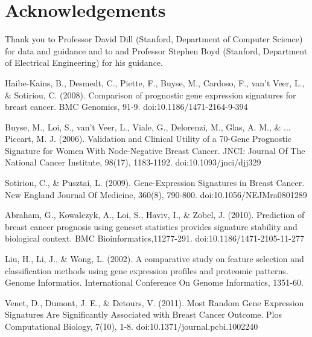 \documentclass[11pt]{article}
\begin{document}
\section{Acknowledgements}
Thank you to Professor David Dill (Stanford, Department of Computer Science) for data and guidance and to and Professor Stephen Boyd (Stanford, Department of Electrical Engineering) for his guidance.

\begin{thebibliography}{9}
 Haibe-Kains, B., Desmedt, C., Piette, F., Buyse, M., Cardoso, F., van't Veer, L., \& Sotiriou, C. (2008). Comparison of prognostic gene expression signatures for breast cancer. BMC Genomics, 91-9. doi:10.1186/1471-2164-9-394

 Buyse, M., Loi, S., van't Veer, L., Viale, G., Delorenzi, M., Glas, A. M., \& ... Piccart, M. J. (2006). Validation and Clinical Utility of a 70-Gene Prognostic Signature for Women With Node-Negative Breast Cancer. JNCI: Journal Of The National Cancer Institute, 98(17), 1183-1192. doi:10.1093/jnci/djj329

 Sotiriou, C., \& Pusztai, L. (2009). Gene-Expression Signatures in Breast Cancer. New England Journal Of Medicine, 360(8), 790-800. doi:10.1056/NEJMra0801289

 Abraham, G., Kowalczyk, A., Loi, S., Haviv, I., \& Zobel, J. (2010). Prediction of breast cancer prognosis using geneset statistics provides signature stability and biological context. BMC Bioinformatics,11277-291. doi:10.1186/1471-2105-11-277

 Liu, H., Li, J., \& Wong, L. (2002). A comparative study on feature selection and classification methods using gene expression profiles and proteomic patterns. Genome Informatics. International Conference On Genome Informatics, 1351-60.

 Venet, D., Dumont, J. E., \& Detours, V. (2011). Most Random Gene Expression Signatures Are Significantly Associated with Breast Cancer Outcome. Plos Computational Biology, 7(10), 1-8. doi:10.1371/journal.pcbi.1002240

\end{thebibliography}
\end{document}

